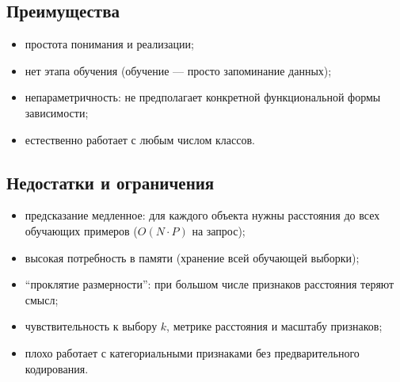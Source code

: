 \documentclass[12pt,a4paper]{article}
\begin{document}
\subsection{Преимущества}
\begin{itemize}
\item простота понимания и реализации;
\item нет этапа обучения (обучение --- просто запоминание данных);
\item непараметричность: не предполагает конкретной функциональной формы зависимости;
\item естественно работает с любым числом классов.
\end{itemize}

\subsection{Недостатки и ограничения}
\begin{itemize}
\item предсказание медленное: для каждого объекта нужны расстояния до всех обучающих примеров ($O(N \cdot P)$ на запрос);
\item высокая потребность в памяти (хранение всей обучающей выборки);
\item ``проклятие размерности'': при большом числе признаков расстояния теряют смысл;
\item чувствительность к выбору $k$, метрике расстояния и масштабу признаков;
\item плохо работает с категориальными признаками без предварительного кодирования.
\end{itemize}
\end{document}
